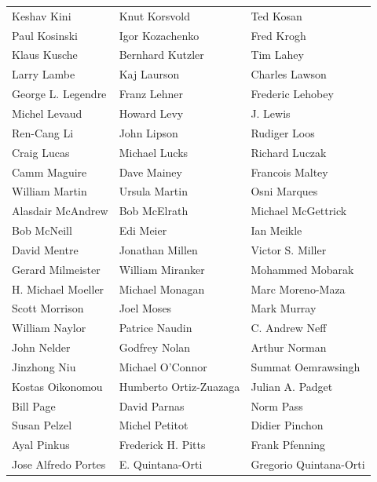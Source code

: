 \vfill
\newpage
\begin{tabular}{lll}
Keshav Kini            & Knut Korsvold          & Ted Kosan\\
Paul Kosinski          & Igor Kozachenko        & Fred Krogh\\
Klaus Kusche           & Bernhard Kutzler       & Tim Lahey\\
Larry Lambe            & Kaj Laurson            & Charles Lawson\\
George L. Legendre     & Franz Lehner           & Frederic Lehobey\\
Michel Levaud          & Howard Levy            & J. Lewis\\
Ren-Cang Li            & John Lipson            & Rudiger Loos\\
Craig Lucas            & Michael Lucks          & Richard Luczak\\
Camm Maguire           & Dave Mainey            & Francois Maltey\\
William Martin         & Ursula Martin          & Osni Marques\\
Alasdair McAndrew      & Bob McElrath           & Michael McGettrick\\
Bob McNeill            & Edi Meier              & Ian Meikle\\
David Mentre           & Jonathan Millen        & Victor S. Miller\\
Gerard Milmeister      & William Miranker       & Mohammed Mobarak\\
H. Michael Moeller     & Michael Monagan        & Marc Moreno-Maza\\
Scott Morrison         & Joel Moses             & Mark Murray\\
William Naylor         & Patrice Naudin         & C. Andrew Neff\\
John Nelder            & Godfrey Nolan          & Arthur Norman\\
Jinzhong Niu           & Michael O'Connor       & Summat Oemrawsingh\\
Kostas Oikonomou       & Humberto Ortiz-Zuazaga & Julian A. Padget\\
Bill Page              & David Parnas           & Norm Pass\\
Susan Pelzel           & Michel Petitot         & Didier Pinchon\\
Ayal Pinkus            & Frederick H. Pitts     & Frank Pfenning\\
Jose Alfredo Portes    & E. Quintana-Orti       & Gregorio Quintana-Orti\\

\end{tabular}
